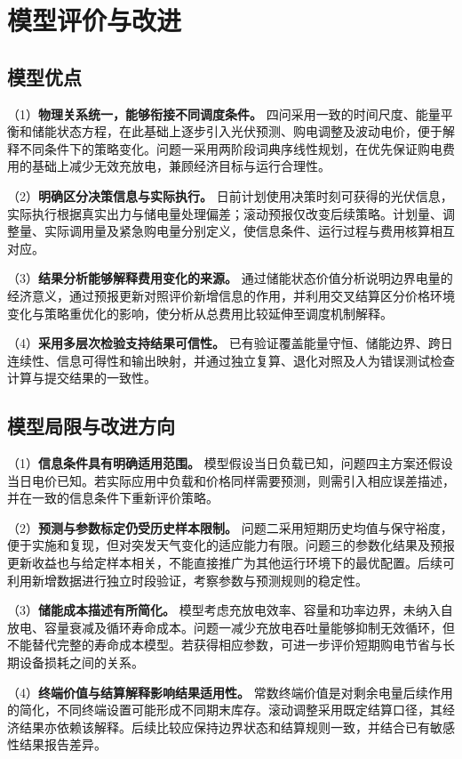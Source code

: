 \documentclass[withoutpreface,bwprint]{cumcmthesis}
\begin{document}
\section{模型评价与改进}

\subsection{模型优点}

（1）\textbf{物理关系统一，能够衔接不同调度条件。}
四问采用一致的时间尺度、能量平衡和储能状态方程，在此基础上逐步引入光伏预测、购电调整及波动电价，便于解释不同条件下的策略变化。问题一采用两阶段词典序线性规划，在优先保证购电费用的基础上减少无效充放电，兼顾经济目标与运行合理性。

（2）\textbf{明确区分决策信息与实际执行。}
日前计划使用决策时刻可获得的光伏信息，实际执行根据真实出力与储电量处理偏差；滚动预报仅改变后续策略。计划量、调整量、实际调用量及紧急购电量分别定义，使信息条件、运行过程与费用核算相互对应。

（3）\textbf{结果分析能够解释费用变化的来源。}
通过储能状态价值分析说明边界电量的经济意义，通过预报更新对照评价新增信息的作用，并利用交叉结算区分价格环境变化与策略重优化的影响，使分析从总费用比较延伸至调度机制解释。

（4）\textbf{采用多层次检验支持结果可信性。}
已有验证覆盖能量守恒、储能边界、跨日连续性、信息可得性和输出映射，并通过独立复算、退化对照及人为错误测试检查计算与提交结果的一致性。

\subsection{模型局限与改进方向}

（1）\textbf{信息条件具有明确适用范围。}
模型假设当日负载已知，问题四主方案还假设当日电价已知。若实际应用中负载和价格同样需要预测，则需引入相应误差描述，并在一致的信息条件下重新评价策略。

（2）\textbf{预测与参数标定仍受历史样本限制。}
问题二采用短期历史均值与保守裕度，便于实施和复现，但对突发天气变化的适应能力有限。问题三的参数化结果及预报更新收益也与给定样本相关，不能直接推广为其他运行环境下的最优配置。后续可利用新增数据进行独立时段验证，考察参数与预测规则的稳定性。

（3）\textbf{储能成本描述有所简化。}
模型考虑充放电效率、容量和功率边界，未纳入自放电、容量衰减及循环寿命成本。问题一减少充放电吞吐量能够抑制无效循环，但不能替代完整的寿命成本模型。若获得相应参数，可进一步评价短期购电节省与长期设备损耗之间的关系。

（4）\textbf{终端价值与结算解释影响结果适用性。}
常数终端价值是对剩余电量后续作用的简化，不同终端设置可能形成不同期末库存。滚动调整采用既定结算口径，其经济结果亦依赖该解释。后续比较应保持边界状态和结算规则一致，并结合已有敏感性结果报告差异。
\end{document}
